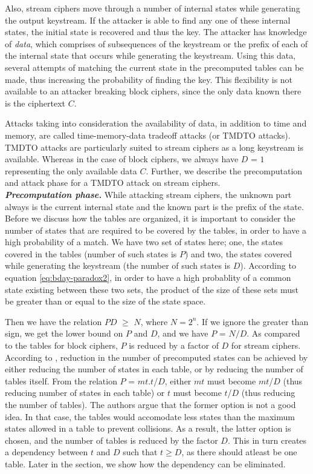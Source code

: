 Also, stream ciphers move through a number of internal states while generating the output keystream. If the attacker is able to find any one of these internal states, the initial state is recovered and thus the key. The attacker has knowledge of \emph{data}, which comprises of subsequences of the keystream or the prefix of each of the internal state that occurs while generating the keystream. Using this data, several attempts of matching the current state in the precomputed tables can be made, thus increasing the probability of finding the key. This flexibility is not available to an attacker breaking block ciphers, since the only data known there is the ciphertext $C$. 

Attacks taking into consideration the availability of data, in addition to time and memory, are called time-memory-data tradeoff attacks (or TMDTO attacks). TMDTO attacks are particularly suited to stream ciphers as a long keystream is available. Whereas in the case of block ciphers, we always have $D$ = $1$ representing the only available data $C$. Further, we describe the precomputation and attack phase for a TMDTO attack on stream ciphers.\\

\noindent \textit{\textbf{Precomputation phase.}} While attacking stream ciphers, the unknown part always is the current internal state and the known part is the prefix of the state. Before we discuss how the tables are organized, it is important to consider the number of states that are required to be covered by the tables, in order to have a high probability of a match. We have two set of states here; one, the states covered in the tables (number of such states is $P$) and two, the states covered while generating the keystream (the number of such states is $D$). According to equation \ref{eq:bday-paradox2}, in order to have a high probablity of a common state existing between these two sets, the product of the size of these sets must be greater than or equal to the size of the state space. 

Then we have the relation $PD$ $\geq$ $N$, where $N = 2^n$. If we ignore the greater than sign, we get the lower bound on $P$ and $D$, and we have $P$ = $N/D$. As compared to the tables for block ciphers, $P$ is reduced by a factor of $D$ for stream ciphers. According to \cite{biryukov2000ctm}, reduction in the number of precomputed states can be achieved by either reducing the number of states in each table, or by reducing the number of tables itself. From the relation $P$ = $mt$.$t$/$D$, either $mt$ must become $mt$/$D$ (thus reducing number of states in each table) or $t$ must become $t$/$D$ (thus reducing the number of tables). The authors argue that the former option is not a good idea. In that case, the tables would accomodate less states than the maximum states allowed in a table to prevent collisions. As a result, the latter option is chosen, and the number of tables is reduced by the factor $D$. This in turn creates a dependency between $t$ and $D$ such that $t \geq D$, as there should atleast be one table. Later in the section, we show how the dependency can be eliminated.

